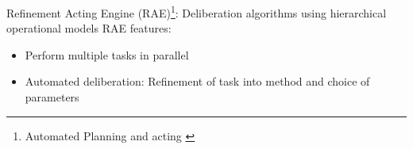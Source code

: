 \begin{frame}{Refinement Acting Engine (RAE)\footnote{Automated Planning and acting \cite{ghallabAutomatedPlanningActing2016}}: Deliberation algorithms using hierarchical operational models}
    RAE features:
    \begin{itemize}
        \item Perform multiple tasks in parallel
        \pause
        \item Automated deliberation: Refinement of task into method and choice of parameters
    \end{itemize}
    \centering
        
\end{frame}
    

